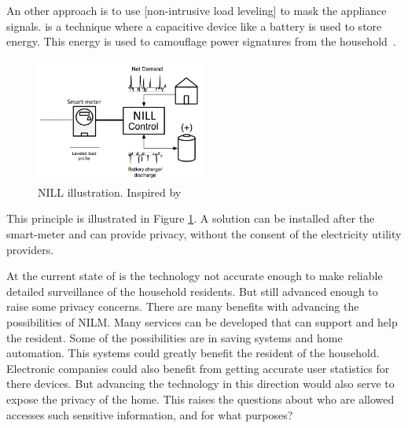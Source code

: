 An other approach is to use [non-intrusive load leveling] to mask the appliance signals.  is a technique where a capacitive device like a battery is used to store energy. This energy is used to camouflage power signatures from the household~\citep{RefWorks:36}. 

\begin{figure}[H]
\centering
\includegraphics[width=0.5\textwidth]{billeder/NILLILU.png}
\caption[NILL illustration.]{NILL illustration. Inspired by~\citep{RefWorks:36}}
\label{fig:NILL}
\end{figure}

This principle is illustrated in Figure \ref{fig:NILL}. A  solution can be installed after the smart-meter and can provide privacy, without the consent of the electricity utility providers.

At the current state of  is the technology not accurate enough to make reliable detailed surveillance of the household residents. But still advanced enough to raise some privacy concerns. There are many benefits with advancing the possibilities of NILM. Many services can be developed that can support and help the resident. Some of the possibilities are in saving systems and home automation. This systems could greatly benefit the resident of the household. Electronic companies could also benefit from getting accurate user statistics for there devices. But advancing the technology in this direction would also serve to expose the privacy of the home. This raises the questions about who are allowed accesses such sensitive information, and for what purposes?